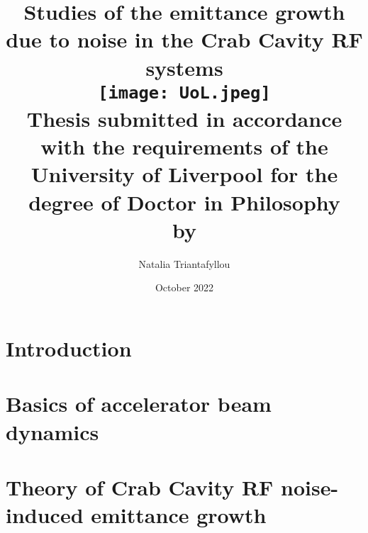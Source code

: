 \documentclass[12pt,twoside]{report} %
\begin{document}
\title{
{Studies of the emittance growth due to noise in the Crab Cavity RF systems}\\
{\texttt{[image: UoL.jpeg]}} \\
{\large Thesis submitted in accordance with the requirements of the University of Liverpool for the degree of Doctor in Philosophy \\ by}
}
\author{ Natalia Triantafyllou}
\date{October 2022}
\maketitle
\newpage

\frontmatter




\frontmatter
\tableofcontents

\listoffigures
{}
\listoftables
{}


%

\newpage


\printnomenclature
{}


\newpage


\thispagestyle{mystyle_acronyms}

\mainmatter

\chapter{Introduction}


\chapter{Basics of accelerator beam dynamics}\label{Ch:theory}


\chapter{Theory of Crab Cavity RF noise-induced emittance growth}\label{Ch:CC_noise_theory}

\end{document}
